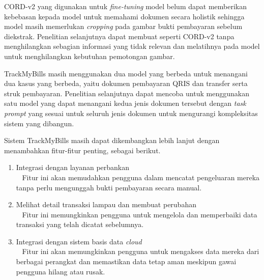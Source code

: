 \datasetfl{} CORD-v2 yang digunakan untuk \emph{fine-tuning} model \donut{} belum dapat memberikan kebebasan kepada model untuk memahami dokumen secara holistik sehingga model masih memerlukan \emph{cropping} pada gambar bukti pembayaran sebelum diekstrak. Penelitian selanjutnya dapat membuat \dataset{} seperti CORD-v2 tanpa menghilangkan sebagian informasi yang tidak relevan dan melatihnya pada model \donut{} untuk menghilangkan kebutuhan pemotongan gambar.

TrackMyBills masih menggunakan dua model yang berbeda untuk menangani dua kasus yang berbeda, yaitu dokumen pembayaran QRIS dan transfer serta struk pembayaran. Penelitian selanjutnya dapat mencoba untuk menggunakan satu model yang dapat menangani kedua jenis dokumen tersebut dengan \emph{task prompt} yang sesuai untuk seluruh jenis dokumen untuk mengurangi kompleksitas sistem yang dibangun.

Sistem TrackMyBills masih dapat dikembangkan lebih lanjut dengan menambahkan fitur-fitur penting, sebagai berikut.
\begin{enumerate}
    \item Integrasi dengan layanan perbankan\\~ Fitur ini akan memudahkan pengguna dalam mencatat pengeluaran mereka tanpa perlu mengunggah bukti pembayaran secara manual.
    \item Melihat detail transaksi lampau dan membuat perubahan\\~ Fitur ini memungkinkan pengguna untuk mengelola dan memperbaiki data transaksi yang telah dicatat sebelumnya.
    \item Integrasi dengan sistem basis data \emph{cloud}\\~
    Fitur ini akan memungkinkan pengguna untuk mengakses data mereka dari berbagai perangkat dan memastikan data tetap aman meskipun gawai pengguna hilang atau rusak.
\end{enumerate}